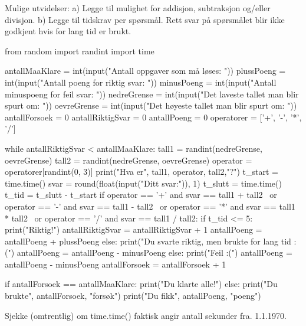 \begin{exercise}
Mulige utvidelser:
a) Legge til mulighet for addisjon, subtraksjon og/eller divisjon. 
b) Legge til tidskrav per spørsmål.
Rett svar på spørsmålet blir ikke godkjent hvis for lang tid er brukt.
\end{exercise}
\begin{solution}
\begin{usncodebox}
from random import randint
import time

antallMaaKlare = int(input("Antall oppgaver som må løses: "))
plussPoeng = int(input("Antall poeng for riktig svar: "))
minusPoeng = int(input("Antall minuspoeng for feil svar: "))
nedreGrense = int(input("Det laveste tallet man blir spurt om: "))
oevreGrense = int(input("Det høyeste tallet man blir spurt om: "))
antallForsoek = 0
antallRiktigSvar = 0
antallPoeng = 0
operatorer = ['+', '-', '*', '/']

while antallRiktigSvar < antallMaaKlare:
    tall1 = randint(nedreGrense, oevreGrense)
    tall2 = randint(nedreGrense, oevreGrense)
    operator = operatorer[randint(0, 3)]
    print("Hva er", tall1, operator, tall2,"?")
    t_start = time.time()
    svar = round(float(input("Ditt svar:")), 1)
    t_slutt = time.time()
    t_tid = t_slutt - t_start
    if operator == '+' and svar == tall1 + tall2 \
        or operator == '-' and svar == tall1 - tall2 \
        or operator == '*' and svar == tall1 * tall2 \
        or operator == '/' and svar == tall1 / tall2:
        if t_tid <= 5:
            print("Riktig!")
            antallRiktigSvar = antallRiktigSvar + 1
            antallPoeng = antallPoeng + plussPoeng
        else:
            print("Du svarte riktig, men brukte for lang tid :(")
            antallPoeng = antallPoeng - minusPoeng
    else:
        print("Feil :(")
        antallPoeng = antallPoeng - minusPoeng
    antallForsoek = antallForsoek + 1

if antallForsoek == antallMaaKlare:
    print("Du klarte alle!")
else:
    print("Du brukte", antallForsoek, "forsøk")
print("Du fikk", antallPoeng, "poeng")
\end{usncodebox}
\end{solution}

\begin{exercise}
Sjekke (omtrentlig) om time.time() faktisk angir antall sekunder fra. 1.1.1970. 
\end{exercise}

